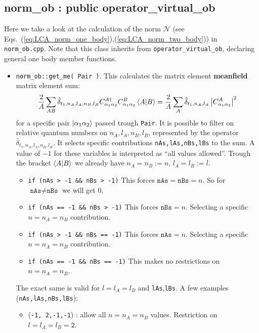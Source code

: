 \documentclass[10pt]{article}
\begin{document}
\subsection{norm\_ob : public operator\_virtual\_ob}
Here we take a look at the calculation of the norm $\mathcal{N}$ (see 
Eqs.~(\ref{eq:LCA_norm_one_body}),(\ref{eq:LCA_norm_two_body})) in 
\texttt{norm\_ob.cpp}.
Note that this class inherits from \texttt{operator\_virtual\_ob}, declaring general one body member functions.
\begin{itemize}
	\item \texttt{norm\_ob::get\_me( Pair )}.
		This calculates the matrix element \textbf{meanfield} matrix element sum:
		\begin{equation}
		\frac{2}{A} \sum_{ A B } \hat{\delta}_{t_1,n_A,l_A,n_B,l_B} C_{\alpha_1 \alpha_2}^{A \dagger} C_{\alpha_1 \alpha_2}^{B} \braket{ A|B} = \frac{2}{A} \sum_{A} \hat{\delta}_{t_1,n_A,l_A} \left| C_{\alpha_1 \alpha_2}^{A} \right|^{2}
		\end{equation}
		for a specific pair $\ket{\alpha_1 \alpha_2}$ passed trough \texttt{Pair}.
		It is possible to filter on relative quantum numbers on $n_A,l_A,n_B,l_B$, represented by the operator $\hat{\delta}_{t_1,n_A,l_A,n_B,l_B}$. It selects specific contributions \texttt{nAs,lAs,nBs,lBs} to the sum. A value of $-1$ for these variables is interpreted as ``all values allowed''. Trough the bracket $\braket{ A | B }$ we already have $n_A = n_B := n$, $l_A = l_B := l$.
		\begin{itemize}
			\item \texttt{if (nAs > -1 \&\& nBs > -1)}
				This forces $\texttt{nAs} = \texttt{nBs} = n$. So for $\texttt{nAs} \neq \texttt{nBs}$ we will get $0$.
			\item \texttt{if (nAs == -1 \&\& nBs > -1)}
				This forces $\texttt{nBs} = n$. Selecting a specific $n = n_A = n_B$ contribution.
			\item \texttt{if (nAs > -1 \&\& nBs == -1)}
				This forces $\texttt{nAs} = n$. Selecting a specific $n = n_A = n_B$ contribution.
			\item \texttt{if (nAs == -1 \&\& nBs == -1)}
				This makes no restrictions on $n = n_A = n_B$.
		\end{itemize}
		The exact same is valid for $l = l_A = l_B$ and \texttt{lAs},\texttt{lBs}.
		A few examples (\texttt{nAs,lAs,nBs,lBs}):
		\begin{itemize}
			\item (\texttt{-1, 2,-1,-1}) : allow all $n = n_A = n_B$ values. Restriction on $l = l_A = l_B = \texttt{2}$.

\end{itemize}
\end{itemize}
\end{document}
